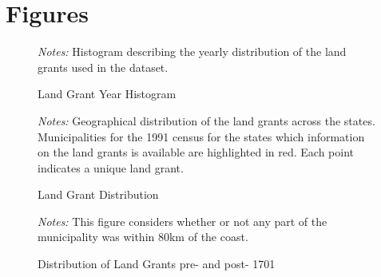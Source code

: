 \documentclass{article}
\begin{document}
\clearpage


\printbibliography

\clearpage

\section*{Figures}

\begin{figure}[h!]
  \caption{Land Grant Year Histogram}
  \begin{center}
  \end{center}
  \textit{Notes:} Histogram describing the yearly distribution of the land grants used in the dataset.  
  \label{fig:year_distribution}
\end{figure}

\begin{figure}[h!]
  \caption{Land Grant Distribution}
  \begin{center}
  \end{center}
  \textit{Notes:} Geographical distribution of the land grants across the states. Municipalities for the 1991 census for the states which information on the land grants is available are highlighted in red. Each point indicates a unique land grant. 
  \label{fig:land_grants_distribution}
\end{figure}

\begin{figure}
  \caption{Distribution of Land Grants pre- and post- 1701}
  \begin{center}
  \textit{Notes:} This figure considers whether or not any part of the municipality was within 80km of the coast.
  \end{center}
  \label{fig:SesmariasDistribution}
\end{figure}
\end{document}
